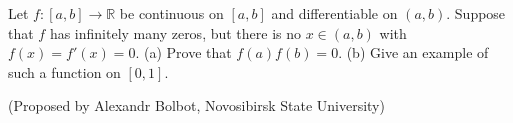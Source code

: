 Let $f : \left[ a, b\right]\rightarrow\mathbb{R}$ be continuous on $\left[ a, b\right]$ and differentiable on $\left( a, b\right)$. Suppose that $f$ has infinitely many zeros, but there is no $x\in \left( a, b\right)$ with $f(x)=f'(x)=0$.
(a) Prove that $f(a)f(b)=0$.
(b) Give an example of such a function on $\left[ 0, 1\right]$.

(Proposed by Alexandr Bolbot, Novosibirsk State University)